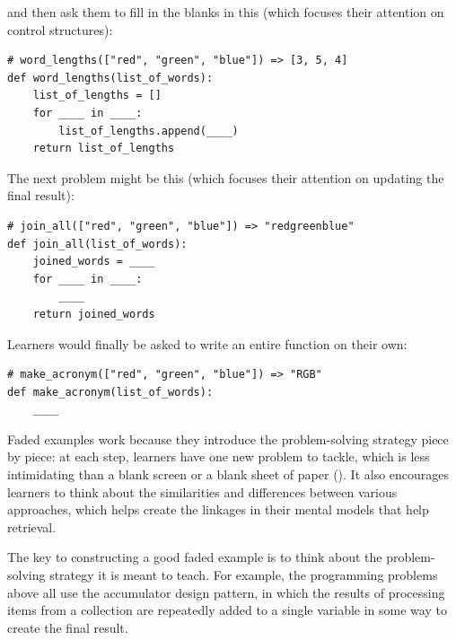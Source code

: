 \noindent
and then ask them to fill in the blanks in this
(which focuses their attention on control structures):

\begin{verbatim}
# word_lengths(["red", "green", "blue"]) => [3, 5, 4]
def word_lengths(list_of_words):
    list_of_lengths = []
    for ____ in ____:
        list_of_lengths.append(____)
    return list_of_lengths
\end{verbatim}

The next problem might be this
(which focuses their attention on updating the final result):

\begin{verbatim}
# join_all(["red", "green", "blue"]) => "redgreenblue"
def join_all(list_of_words):
    joined_words = ____
    for ____ in ____:
        ____
    return joined_words
\end{verbatim}

Learners would finally be asked to write an entire function on their own:

\begin{verbatim}
# make_acronym(["red", "green", "blue"]) => "RGB"
def make_acronym(list_of_words):
    ____
\end{verbatim}

Faded examples work because
they introduce the problem-solving strategy piece by piece:
at each step,
learners have one new problem to tackle,
which is less intimidating than a blank screen or a blank sheet of paper ().
It also encourages learners to think about the similarities and differences between various approaches,
which helps create the linkages in their mental models that help retrieval.

The key to constructing a good faded example is
to think about the problem-solving strategy it is meant to teach.
For example,
the programming problems above all use the accumulator design pattern,
in which the results of processing items from a collection
are repeatedly added to a single variable in some way to create the final result.

